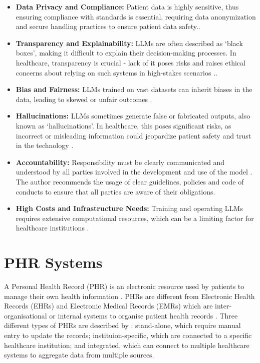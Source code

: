 \begin{itemize}
    \item \textbf{Data Privacy and Compliance:} Patient data is highly sensitive, thus ensuring compliance with standards is essential, requiring data anonymization and secure handling practices to ensure patient data safety.\parencite{llm_healthcare,llm_healthcare2,llm_healthcare4}.
    \item \textbf{Transparency and Explainability:} LLMs are often described as `black boxes', making it difficult to explain their decision-making processes. In healthcare, transparency is crucial - lack of it poses risks and raises ethical concerns about relying on such systems in high-stakes scenarios \parencite{llm_healthcare,llm_healthcare2,llm_healthcare4}..
    \item \textbf{Bias and Fairness:} LLMs trained on vast datasets can inherit biases in the data, leading to skewed or unfair outcomes \parencite{llm_healthcare2}.
    \item \textbf{Hallucinations:} LLMs sometimes generate false or fabricated outputs, also known as `hallucinations'. In healthcare, this poses significant risks, as incorrect or misleading information could jeopardize patient safety and trust in the technology \parencite{llm_healthcare4,llm_healthcare}.
    \item \textbf{Accountability:} Responsibility must be clearly communicated and understood by all parties involved in the development and use of the model \parencite{llm_healthcare2}. The author recommends the usage of clear guidelines, policies and code of conducts to ensure that all parties are aware of their obligations.
    \item \textbf{High Costs and Infrastructure Needs:} Training and operating LLMs requires extensive computational resources, which can be a limiting factor for healthcare institutions \parencite{llm_healthcare4}.
\end{itemize}

\section{PHR Systems}

A Personal Health Record (PHR) is an electronic resource
used by patients to manage their own health information \parencite{phrsecurity,phrlist}. PHRs are different from Electronic Health Records (EHRs) and Electronic Medical Records (EMRs) which are inter-organisational or internal systems to organise patient health records \parencite{phrdiff,phrlist}. Three different types of PHRs are described by \textcite{phrsecurity}: stand-alone, which require manual entry to update the records; instituion-specific, which are connected to a specific healthcare institution; and integrated, which can connect to multiple healthcare systems to aggregate data from multiple sources. 

